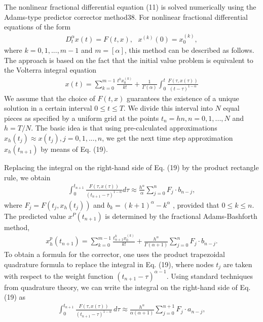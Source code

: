 \documentclass{article}
\begin{document}
{\begin{multicols}{2}
The nonlinear fractional differential equation (11)
is solved numerically using the Adams-type predictor corrector method38. For nonlinear fractional differential equations of the form
\begin{align}
    D_t^\alpha x(t) = F(t,x), ~~~ x^{(k)}(0) = x_0^{(k)},
\end{align}
where $k = 0, 1, . . . , m - 1$ and $m = [\alpha]$, this method can
be described as follows. The approach is based on the
fact that the initial value problem is equivalent to the
Volterra integral equation
\begin{align}
    x(t) = \sum_{k=0}^{m-1} \frac{t^k x_0^{(k)}}{k!} + \frac{1}{\Gamma (\alpha)} \int_0^t \frac{F(\tau , x(\tau))}{(t- \tau)^{1-\alpha}}
\end{align}
We assume that the choice of $F(t, x)$ guarantees the existence of a unique solution in a certain interval $0 \le t \le T$.
We divide this interval into $N$ equal pieces as specified
by a uniform grid at the points $t_n = hn, n = 0, 1, . . . , N$
and $h = T / N$. The basic idea is that using pre-calculated
approximations $x_h(t_j ) \approx x(t_j ), j = 0, 1, . . . , n$, we get
the next time step approximation $x_h(t_{n+1})$ by means of
Eq. (19). \par
Replacing the integral on the right-hand side of
Eq. (19) by the product rectangle rule, we obtain
\begin{align}
    \int_0^{t_{n+1}} \frac{F(\tau , x(\tau))}{(t_{n+1}-\tau)^{1-\alpha}}d\tau \approx \frac{h^\alpha}{\alpha} \sum_{j=0}^n F_j \cdot b_{n-j},
\end{align}
where $F_j = F(t_j , x_h(t_j))$ and $b_k = (k + 1)^\alpha - k^\alpha$
, provided that $0 \le k \le n$. The predicted value $x^P (t_{n+1})$ is
determined by the fractional Adams-Bashforth method,
\begin{align}
   x_h^p (t_{n+1}) = \sum_{k=0}^{m-1} \frac{t_{n+1}^k x_0^{(k)}}{k!} + \frac{h^\alpha}{\Gamma (\alpha + 1)} \sum_{j=0}^n F_j \cdot b_{n-j}.
\end{align}
To obtain a formula for the corrector, one uses the product trapezoidal quadrature formula to replace the integral in Eq. (19), where nodes $t_j$ are taken with respect to the weight function $(t_{n+1} - \tau)^{\alpha - 1}$. Using standard techniques from quadrature theory, we can write the integral on the right-hand side of Eq. (19) as
\begin{align}
   \int_0^{t_{n+1}} \frac{F(\tau,x(\tau))}{(t_{n+1}-\tau)^{1-\alpha}}\,d\tau \approx \frac{h^\alpha}{\alpha(\alpha + 1)} \sum_{j=0}^{n+1} F_j \cdot a_{n-j},

\end{align}
\end{multicols}}
\end{document}
